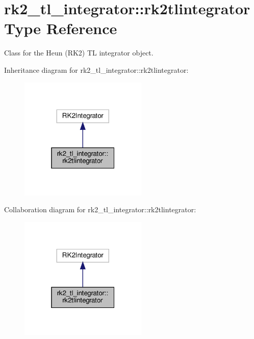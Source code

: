 \hypertarget{structrk2__tl__integrator_1_1rk2tlintegrator}{}\section{rk2\+\_\+tl\+\_\+integrator\+:\+:rk2tlintegrator Type Reference}
\label{structrk2__tl__integrator_1_1rk2tlintegrator}


Class for the Heun (R\+K2) TL integrator object.  




Inheritance diagram for rk2\+\_\+tl\+\_\+integrator\+:\+:rk2tlintegrator\+:\nopagebreak
\begin{figure}[H]
\begin{center}
\leavevmode
\includegraphics[width=172pt]{structrk2__tl__integrator_1_1rk2tlintegrator__inherit__graph}
\end{center}
\end{figure}


Collaboration diagram for rk2\+\_\+tl\+\_\+integrator\+:\+:rk2tlintegrator\+:\nopagebreak
\begin{figure}[H]
\begin{center}
\leavevmode
\includegraphics[width=172pt]{structrk2__tl__integrator_1_1rk2tlintegrator__coll__graph}
\end{center}
\end{figure}


